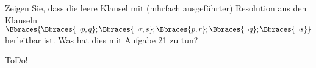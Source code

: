 
\begin{exercise}[40]

Zeigen Sie, dass die leere Klausel mit (mhrfach ausgeführter) Resolution aus den Klauseln $\Bbraces{\Bbraces{\neg p, q}; \Bbraces{\neg r, s}; \Bbraces{p, r}; \Bbraces{\neg q}; \Bbraces{\neg s}}$ herleitbar ist.
Was hat dies mit Aufgabe 21 zu tun?

\end{exercise}


\begin{solution}

ToDo!

\end{solution}

